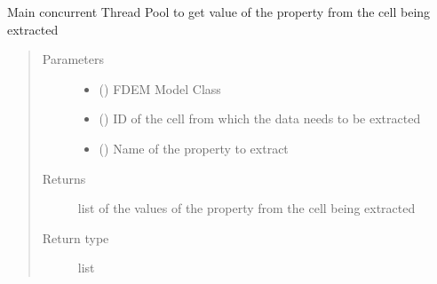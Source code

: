 \documentclass[letterpaper,10pt,english]{sphinxmanual}
\begin{document}

\begin{fulllineitems}
\label{\detokenize{openfdem:openfdem.extract_cell_thread_pool_generators.main}}
Main concurrent Thread Pool to get value of the property from the cell being extracted
\begin{quote}\begin{description}
\item[{Parameters}] \leavevmode\begin{itemize}
\item {} 
 ({\hyperref[\detokenize{openfdem:openfdem.openfdem.Model}]{}}) \textendash{} FDEM Model Class

\item {} 
 () \textendash{} ID of the cell from which the data needs to be extracted

\item {} 
 () \textendash{} Name of the property to extract

\end{itemize}

\item[{Returns}] \leavevmode
list of the values of the property from the cell being extracted

\item[{Return type}] \leavevmode
list

\end{description}\end{quote}

\end{fulllineitems}
\end{document}
